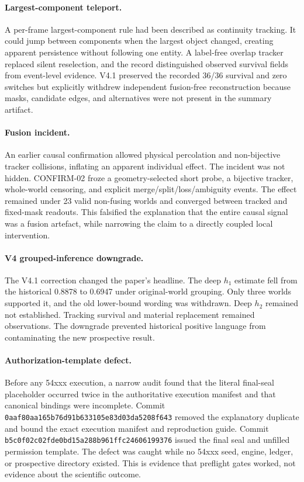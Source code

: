 \documentclass[11pt]{article}
\newcommand{\code}[1]{\texttt{#1}}
\begin{document}
\paragraph{Largest-component teleport.}
A per-frame largest-component rule had been described as continuity tracking. It could jump between components when the largest object changed, creating apparent persistence without following one entity. A label-free overlap tracker replaced silent reselection, and the record distinguished observed survival fields from event-level evidence. V4.1 preserved the recorded 36/36 survival and zero switches but explicitly withdrew independent fusion-free reconstruction because masks, candidate edges, and alternatives were not present in the summary artifact.

\paragraph{Fusion incident.}
An earlier causal confirmation allowed physical percolation and non-bijective tracker collisions, inflating an apparent individual effect. The incident was not hidden. CONFIRM-02 froze a geometry-selected short probe, a bijective tracker, whole-world censoring, and explicit merge/split/loss/ambiguity events. The effect remained under 23 valid non-fusing worlds and converged between tracked and fixed-mask readouts. This falsified the explanation that the entire causal signal was a fusion artefact, while narrowing the claim to a directly coupled local intervention.

\paragraph{V4 grouped-inference downgrade.}
The V4.1 correction changed the paper's headline. The deep $h_1$ estimate fell from the historical 0.8878 to 0.6947 under original-world grouping. Only three worlds supported it, and the old lower-bound wording was withdrawn. Deep $h_2$ remained not established. Tracking survival and material replacement remained observations. The downgrade prevented historical positive language from contaminating the new prospective result.

\paragraph{Authorization-template defect.}
Before any 54xxx execution, a narrow audit found that the literal final-seal placeholder occurred twice in the authoritative execution manifest and that canonical bindings were incomplete. Commit \code{0aaf80aa165b76d91b633105e83d03da5208f643} removed the explanatory duplicate and bound the exact execution manifest and reproduction guide. Commit \code{b5c0f02c02fde0bd15a288b961ffc24606199376} issued the final seal and unfilled permission template. The defect was caught while no 54xxx seed, engine, ledger, or prospective directory existed. This is evidence that preflight gates worked, not evidence about the scientific outcome.
\end{document}
